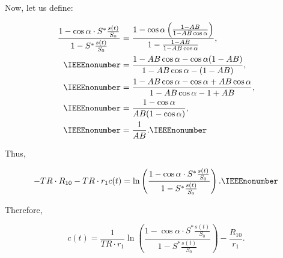 Now, let us define:

\begin{align*}
  \frac{1 - \cos \alpha \cdot S^{*}\frac{s(t)}{S_0}}{1 - S^{*}\frac{s(t)}{S_0}} &= \frac{ 1 - \cos \alpha\left(\frac{1 - A B}{1 - A B \cos \alpha}\right)} {1 - \frac{1 - A B}{1 - A B \cos \alpha}} , \\ \IEEEnonumber
  &= \frac{1 - A B \cos \alpha - \cos \alpha(1 - A B)}{1 - A B \cos \alpha - (1 - A B)} , \\ \IEEEnonumber
  &= \frac{1 - A B \cos \alpha - \cos \alpha + A B \cos \alpha}{1 - A B \cos \alpha - 1 + A B} , \\ \IEEEnonumber
  &= \frac{1 - \cos \alpha}{ A B (1 - \cos \alpha)}, \\ \IEEEnonumber
  &= \frac{1}{A B}. \IEEEnonumber
\end{align*}

Thus,

\begin{equation}
  -TR \cdot R_{10} -TR \cdot r_1 c(t) = \ln\left( \frac{1 - \cos \alpha \cdot S^{*}\frac{s(t)}{S_0}}{1 - S^{*}\frac{s(t)}{S_0}} \right) . \IEEEnonumber
\end{equation}

Therefore,

\begin{equation}
  c(t) = \frac{1}{TR \cdot r_1} \ln\left( \frac{1 - \cos \alpha \cdot S^{*}\frac{s(t)}{S_0}}{1 - S^{*}\frac{s(t)}{S_0}} \right) - \frac{R_{10}}{r_1} .
\end{equation}



